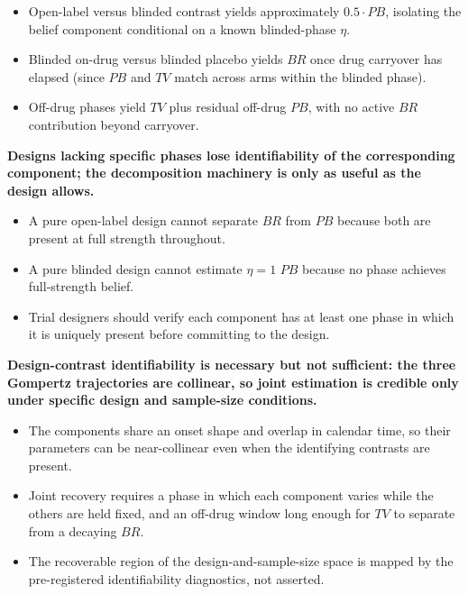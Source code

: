 \documentclass[
  11pt,
]{article}
\begin{document}
\begin{itemize}\setlength{\itemsep}{2pt}\setlength{\parskip}{0pt}
\item Open-label versus blinded contrast yields approximately $0.5 \cdot PB$, isolating the belief component conditional on a known blinded-phase $\eta$.
\item Blinded on-drug versus blinded placebo yields $BR$ once drug carryover has elapsed (since $PB$ and $TV$ match across arms within the blinded phase).
\item Off-drug phases yield $TV$ plus residual off-drug $PB$, with no active $BR$ contribution beyond carryover.
\end{itemize}

\textbf{Designs lacking specific phases lose identifiability of the corresponding component; the decomposition machinery is only as useful as the design allows.}

\begin{itemize}\setlength{\itemsep}{2pt}\setlength{\parskip}{0pt}
\item A pure open-label design cannot separate $BR$ from $PB$ because both are present at full strength throughout.
\item A pure blinded design cannot estimate $\eta = 1$ $PB$ because no phase achieves full-strength belief.
\item Trial designers should verify each component has at least one phase in which it is uniquely present before committing to the design.
\end{itemize}

\textbf{Design-contrast identifiability is necessary but not sufficient: the three Gompertz trajectories are collinear, so joint estimation is credible only under specific design and sample-size conditions.}

\begin{itemize}\setlength{\itemsep}{2pt}\setlength{\parskip}{0pt}
\item The components share an onset shape and overlap in calendar time, so their parameters can be near-collinear even when the identifying contrasts are present.
\item Joint recovery requires a phase in which each component varies while the others are held fixed, and an off-drug window long enough for $TV$ to separate from a decaying $BR$.
\item The recoverable region of the design-and-sample-size space is mapped by the pre-registered identifiability diagnostics, not asserted.
\end{itemize}
\end{document}
